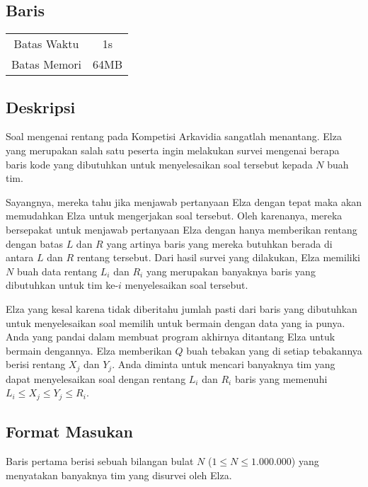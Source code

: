 \documentclass{article}
\begin{document}
\begin{center}
    \section*{Baris} %

    \begin{tabular}{ | c c | }
        \hline
        Batas Waktu  & 1s \\    %
        Batas Memori & 64MB \\  %
        \hline
    \end{tabular}
\end{center}

\subsection*{Deskripsi}

Soal mengenai rentang pada Kompetisi Arkavidia sangatlah menantang.
Elza yang merupakan salah satu peserta ingin melakukan survei mengenai berapa baris kode yang dibutuhkan untuk menyelesaikan soal tersebut kepada $N$ buah tim.

Sayangnya, mereka tahu jika menjawab pertanyaan Elza dengan tepat maka akan memudahkan Elza untuk mengerjakan soal tersebut.
Oleh karenanya, mereka bersepakat untuk menjawab pertanyaan Elza dengan hanya memberikan rentang dengan batas $L$ dan $R$ yang artinya baris yang mereka butuhkan berada di antara $L$ dan $R$ rentang tersebut.
Dari hasil survei yang dilakukan, 
Elza memiliki $N$ buah data rentang $L_i$ dan $R_i$ yang merupakan banyaknya baris yang dibutuhkan untuk tim ke-$i$ menyelesaikan soal tersebut.

Elza yang kesal karena tidak diberitahu jumlah pasti dari baris yang dibutuhkan untuk menyelesaikan soal memilih untuk bermain dengan data yang ia punya.
Anda yang pandai dalam membuat program akhirnya ditantang Elza untuk bermain dengannya.
Elza memberikan $Q$ buah tebakan yang di setiap tebakannya berisi rentang $X_j$ dan $Y_j$.
Anda diminta untuk mencari banyaknya tim yang dapat menyelesaikan soal dengan rentang $L_i$ dan $R_i$ baris yang memenuhi $L_i \leq X_j \leq Y_j \leq R_i$.


\subsection*{Format Masukan}
Baris pertama berisi sebuah bilangan bulat $N$ ($1 \leq N \leq 1.000.000$) yang menyatakan banyaknya tim yang disurvei oleh Elza.
\end{document}
